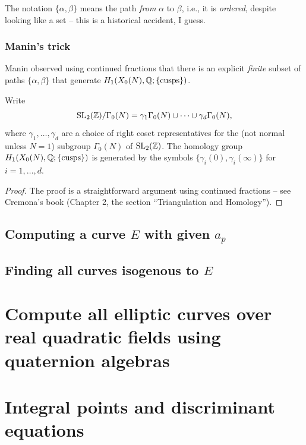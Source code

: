 \documentclass{book}
\begin{document}
\begin{remark}
The notation $\{\alpha,\beta\}$ means the path {\em from}
$\alpha$ to $\beta$, i.e., it is {\em ordered}, despite looking
like a set -- this is a historical accident, I guess.
\end{remark}

\subsubsection{Manin's trick}
Manin observed using continued fractions that
there is an explicit
{\em finite} subset of paths $\{\alpha,\beta\}$
that generate $H_1(X_0(N),\mathbb{Q}; \{\text{cusps}\})$.

\begin{proposition}
Write
$$\operatorname{SL}_2(\mathbb{Z}) / \Gamma_0(N)
  = \gamma_1 \Gamma_0(N) \cup \cdots \cup \gamma_d \Gamma_0(N),
$$
where $\gamma_1, \ldots, \gamma_d$ are a choice of right
coset representatives for the (not normal unless $N=1$)
subgroup $\Gamma_0(N)$ of $\operatorname{SL}_2(\mathbb{Z})$.
The homology group  $H_1(X_0(N),\mathbb{Q}; \{\text{cusps}\})$
is generated by the symbols
$\{\gamma_i(0),\gamma_i(\infty)\}$ for $i=1,\ldots, d$.
\end{proposition}
\begin{proof} The proof is a straightforward argument
using continued fractions -- see Cremona's book
(Chapter 2, the section ``Triangulation and Homology'').
\end{proof}





\subsection{Computing a curve $E$ with given $a_p$}

\subsection{Finding all curves isogenous to $E$}


\section{Compute all elliptic curves over real quadratic fields using quaternion algebras}

\section{Integral points and discriminant equations}
\end{document}
